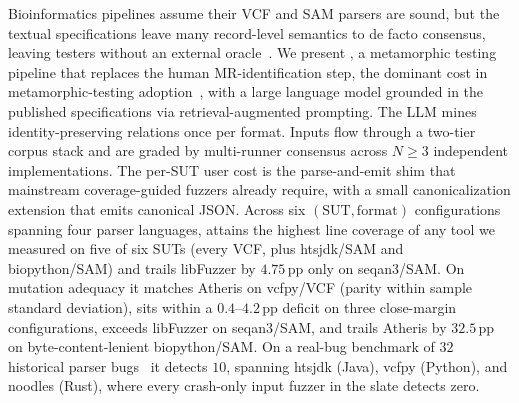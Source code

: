 Bioinformatics pipelines assume their VCF and SAM parsers are
sound, but the textual specifications leave many record-level
semantics to de facto consensus, leaving testers without an
external oracle~\citep{krusche2019benchmarking,barr2015oracle}. We present \biotest{}, a
metamorphic testing pipeline that replaces the human
MR-identification step, the dominant cost in metamorphic-testing
adoption~\citep{chen2018metamorphic}, with a large language
model grounded in the published specifications via
retrieval-augmented prompting. The LLM mines
identity-preserving relations once per format. Inputs flow
through a two-tier corpus stack and are graded by
multi-runner consensus across $N{\geq}3$ independent
implementations. The per-SUT user cost is the parse-and-emit shim
that mainstream coverage-guided fuzzers already require, with a
small canonicalization extension that emits canonical JSON.
Across six $(\mathrm{SUT, format})$ configurations spanning four
parser languages, \biotest{} attains the highest line coverage of
any tool we measured on five of six SUTs (every VCF, plus
htsjdk/SAM and biopython/SAM) and trails libFuzzer by
$4.75$\,pp only on seqan3/SAM. On mutation
adequacy it matches Atheris on vcfpy/VCF (parity within sample
standard deviation), sits within a $0.4$--$4.2$\,pp deficit on
three close-margin configurations, exceeds libFuzzer on
seqan3/SAM, and trails Atheris by $32.5$\,pp on byte-content-lenient
biopython/SAM. On a real-bug benchmark of $32$ historical parser
bugs~\citep{hazimeh2020magma} it detects $10$, spanning htsjdk
(Java), vcfpy (Python), and noodles (Rust), where every crash-only
input fuzzer in the slate detects zero.
